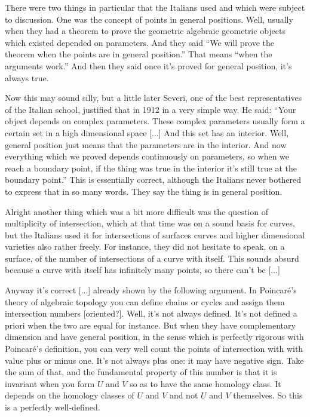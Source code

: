 \documentclass{article}
\begin{document}
There were two things in particular that the Italians used
and which were subject to discussion.
One was the concept of points in general positions.
Well, usually when they had a theorem to prove
the geometric algebraic geometric objects which existed
depended on parameters.
And they said ``We will prove the theorem when the points are in general position.''
That means ``when the arguments work.''
And then they said once it's proved for general position, it's always true.

Now this may sound silly,
but a little later Severi,
one of the best representatives of the Italian school,
justified that in 1912 in a very simple way.
He said: ``Your object depends on complex parameters.
These complex parameters usually form a certain set 
in a high dimensional space [...]
And this set has an interior.
Well, general position just means that the parameters are in the interior.
And now everything which we proved depends continuously on parameters,
so when we reach a boundary point, 
if the thing was true in the interior
it's still true at the boundary point.''
This is essentially correct,
although the Italians never bothered to express that in so many words.
They say the thing is in general position.

Alright another thing which was a bit more difficult
was the question of multiplicity of intersection,
which at that time was on a sound basis for curves,
but the Italians used it 
for intersections of surfaces curves and higher dimensional varieties
also rather freely.
For instance, they did not hesitate to speak, on a surface,
of the number of intersections of a curve with itself.
This sounds absurd because a curve with itself has infinitely many points,
so there can't be [...]

Anyway it's correct [...] already shown
by the following argument.
In Poincar\'e's theory of algebraic topology
you can define chains or cycles
and assign them intersection numbers [oriented?].
Well, it's not always defined.
It's not defined a priori when the two are equal for instance.
But when they have complementary dimension 
and have general position, 
in the sense which is perfectly rigorous with Poincar\'e's definition,
you can very well count the points of intersection 
with with value plus or minus one.
It's not always plus one: it may have negative sign.
Take the sum of that,
and the fundamental property of this number 
is that it is invariant when you form $U$ and $V$ 
so as to have the same homology class.
It depends on the homology classes of $U$ and $V$ 
and not $U$ and $V$ themselves.
So this is a perfectly well-defined.
\end{document}
